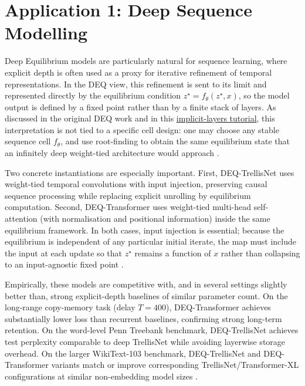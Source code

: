 \section{Application 1: Deep Sequence Modelling}
Deep Equilibrium models are particularly natural for sequence learning, where explicit depth is often used as a proxy for iterative refinement of temporal representations. In the DEQ view, this refinement is sent to its limit and represented directly by the equilibrium condition $z^\star = f_\theta(z^\star, x)$,
so the model output is defined by a fixed point rather than by a finite stack of layers. As discussed in the original DEQ work and in this \href{https://implicit-layers-tutorial.org/deep_equilibrium_models/}{implicit-layers tutorial}, this interpretation is not tied to a specific cell design: one may choose any stable sequence cell $f_\theta$, and use root-finding to obtain the same equilibrium state that an infinitely deep weight-tied architecture would approach \cite{bai2019deep, kolter2020deepimplicit}.

Two concrete instantiations are especially important. First, DEQ-TrellisNet uses weight-tied temporal convolutions with input injection, preserving causal sequence processing while replacing explicit unrolling by equilibrium computation. Second, DEQ-Transformer uses weight-tied multi-head self-attention (with normalisation and positional information) inside the same equilibrium framework. In both cases, input injection is essential; because the equilibrium is independent of any particular initial iterate, the map must include the input at each update so that $z^\star$ remains a function of $x$ rather than collapsing to an input-agnostic fixed point \cite{bai2019deep, kolter2020deepimplicit}.

Empirically, these models are competitive with, and in several settings slightly better than, strong explicit-depth baselines of similar parameter count. On the long-range copy-memory task (delay $T=400$), DEQ-Transformer achieves substantially lower loss than recurrent baselines, confirming strong long-term retention. On the word-level Penn Treebank benchmark, DEQ-TrellisNet achieves test perplexity comparable to deep TrellisNet while avoiding layerwise storage overhead. On the larger WikiText-103 benchmark, DEQ-TrellisNet and DEQ-Transformer variants match or improve corresponding TrellisNet/Transformer-XL configurations at similar non-embedding model sizes \cite{bai2019deep}.


